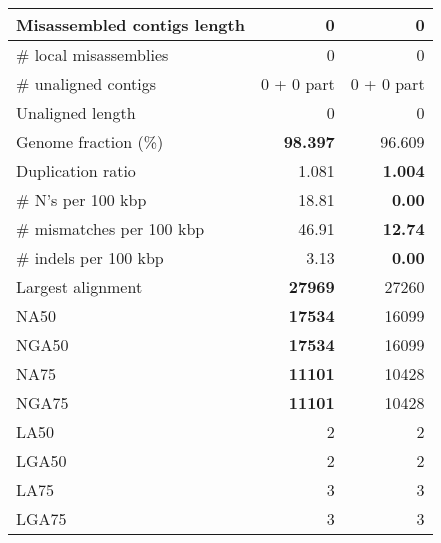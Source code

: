 \documentclass[12pt,a4paper]{article}
\begin{document}
\begin{table}[ht]
\begin{center}
\begin{tabular}{|l*{2}{|r}|}
Misassembled contigs length & 0 & 0 \\ \hline
\# local misassemblies & 0 & 0 \\ \hline
\# unaligned contigs & 0 + 0 part & 0 + 0 part \\ \hline
Unaligned length & 0 & 0 \\ \hline
Genome fraction (\%) & {\bf 98.397} & 96.609 \\ \hline
Duplication ratio & 1.081 & {\bf 1.004} \\ \hline
\# N's per 100 kbp & 18.81 & {\bf 0.00} \\ \hline
\# mismatches per 100 kbp & 46.91 & {\bf 12.74} \\ \hline
\# indels per 100 kbp & 3.13 & {\bf 0.00} \\ \hline
Largest alignment & {\bf 27969} & 27260 \\ \hline
NA50 & {\bf 17534} & 16099 \\ \hline
NGA50 & {\bf 17534} & 16099 \\ \hline
NA75 & {\bf 11101} & 10428 \\ \hline
NGA75 & {\bf 11101} & 10428 \\ \hline
LA50 & 2 & 2 \\ \hline
LGA50 & 2 & 2 \\ \hline
LA75 & 3 & 3 \\ \hline
LGA75 & 3 & 3 \\ \hline
\end{tabular}
\end{center}
\end{table}
\end{document}

